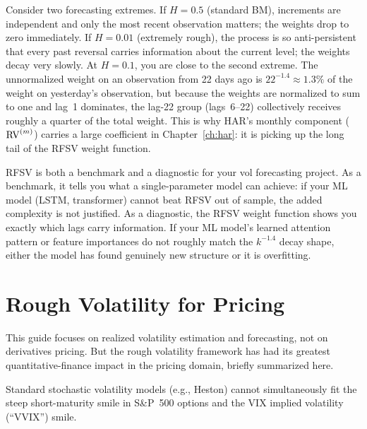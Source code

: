 \begin{intuition}
Consider two forecasting extremes.
If $H = 0.5$ (standard BM), increments are independent and only the most recent observation matters; the weights drop to zero immediately.
If $H = 0.01$ (extremely rough), the process is so anti-persistent that every past reversal carries information about the current level; the weights decay very slowly.
At $H = 0.1$, you are close to the second extreme.
The unnormalized weight on an observation from 22 days ago is $22^{-1.4} \approx 1.3\%$ of the weight on yesterday's observation, but because the weights are normalized to sum to one and lag~1 dominates, the lag-22 group (lags~6--22) collectively receives roughly a quarter of the total weight.
This is why HAR's monthly component ($\operatorname{RV}^{(m)}$) carries a large coefficient in Chapter~\ref{ch:har}: it is picking up the long tail of the RFSV weight function.
\end{intuition}

\begin{projectconnection}
RFSV is both a benchmark and a diagnostic for your vol forecasting project.
As a benchmark, it tells you what a single-parameter model can achieve: if your ML model (LSTM, transformer) cannot beat RFSV out of sample, the added complexity is not justified.
As a diagnostic, the RFSV weight function shows you exactly which lags carry information.
If your ML model's learned attention pattern or feature importances do not roughly match the $k^{-1.4}$ decay shape, either the model has found genuinely new structure or it is overfitting.
\end{projectconnection}

\section{Rough Volatility for Pricing}
\label{sec:rough-pricing}

This guide focuses on realized volatility estimation and forecasting, not on derivatives pricing.
But the rough volatility framework has had its greatest quantitative-finance impact in the pricing domain, briefly summarized here.

\begin{prereq}
Standard stochastic volatility models (e.g., Heston) cannot simultaneously fit the steep short-maturity smile in S\&P~500 options and the VIX implied volatility (``VVIX'') smile.
\end{prereq}

